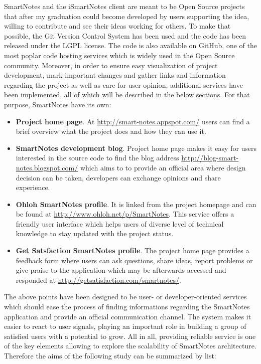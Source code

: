 SmartNotes and the iSmartNotes client are meant to be Open Source projects that after my graduation could become developed by users supporting the idea, willing to contribute and see their ideas working for others. To make that possible, the Git Version Control System has been used and the code has been released under the LGPL license. The code is also available on GitHub, one of the most poplar code hosting services which is widely used in the Open Source community. Moreover, in order to ensure easy visualization of project development, mark important changes and gather links and information regarding the project as well as care for user opinion, additional services have been implemented, all of which will be described in the below sections. For that purpose, SmartNotes have its own:
\begin{itemize}
\item{\textbf{Project home page}. At \url{http://smart-notes.appspot.com/} users can find a brief overview what the project does and how they can use it.}
\item{\textbf{SmartNotes development blog}. Project home page makes it easy for users interested in the source code to find the blog address \url{http://blog-smart-notes.blogspot.com/} which aims to to provide an official area where design decision can be taken, developers can exchange opinions and share experience.}
\item{\textbf{Ohloh SmartNotes profile}. It is linked from the project homepage and can be found at \url{http://www.ohloh.net/p/SmartNotes}. This service offers a friendly user interface which helps users of diverse level of technical knowledge to stay updated with the project status.}
\item{\textbf{Get Satsfaction SmartNotes profile}. The project home page provides a feedback form where users can ask questions, share ideas, report problems or give praise to the application which may be afterwards accessed and responded at \url{http://getsatisfaction.com/smartnotes/}.}
\end{itemize}
The above points have been designed to be user- or developer-oriented services which should ease the process of finding informations regarding the SmartNotes application and provide an official communication channel. The system makes it easier to react to user signals, playing an important role in building a group of satisfied users with a potential to grow. All in all, providing reliable service is one of the key elements allowing to explore the scalability of SmartNotes architecture. Therefore the aims of the following study can be summarized by list:
